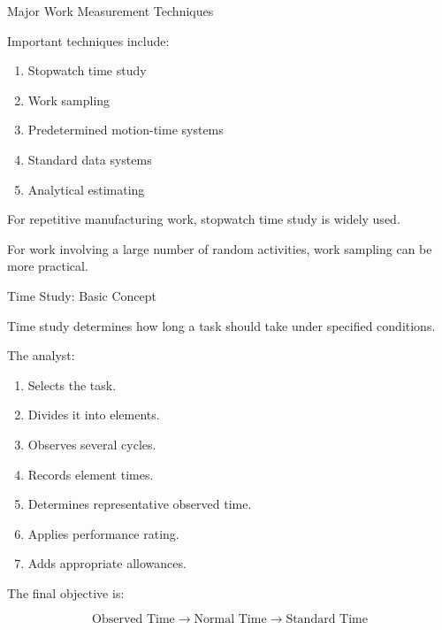 \documentclass[aspectratio=169,10pt]{beamer}
\begin{document}

\begin{frame}[shrink=18]{Major Work Measurement Techniques}
\small

Important techniques include:

\begin{enumerate}
    \item Stopwatch time study
    \item Work sampling
    \item Predetermined motion-time systems
    \item Standard data systems
    \item Analytical estimating
\end{enumerate}

\vspace{6pt}

For repetitive manufacturing work, stopwatch time study is widely used.

For work involving a large number of random activities,
work sampling can be more practical.

\end{frame}


\begin{frame}[shrink=18]{Time Study: Basic Concept}
\small

Time study determines how long a task should take under specified
conditions.

The analyst:

\begin{enumerate}
    \item Selects the task.
    \item Divides it into elements.
    \item Observes several cycles.
    \item Records element times.
    \item Determines representative observed time.
    \item Applies performance rating.
    \item Adds appropriate allowances.
\end{enumerate}

The final objective is:

\[
\boxed{
\text{Observed Time}
\rightarrow
\text{Normal Time}
\rightarrow
\text{Standard Time}
}
\]

\end{frame}
\end{document}
